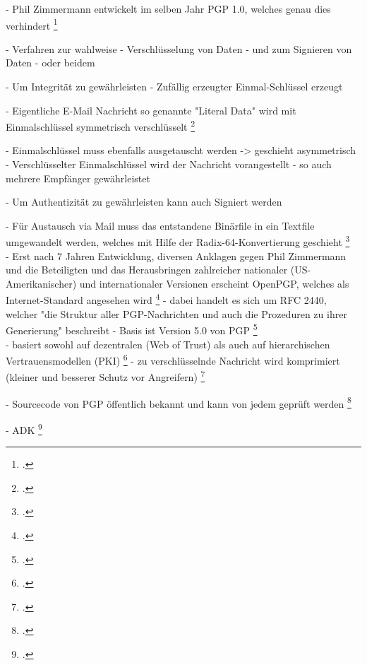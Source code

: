 \documentclass  [paper=a4,
				fontsize=12pt,
				listof=totoc,
				bibliography=totoc
				]{scrreprt}
\begin{document}
				- Phil Zimmermann entwickelt im selben Jahr PGP 1.0, welches genau dies verhindert 
				\footcite[][S. 29]{Schwenk}
				
				- Verfahren zur wahlweise
				- Verschlüsselung von Daten
				- und zum Signieren von Daten
				- oder beidem
				
				
				- Um Integrität zu gewährleisten
				- Zufällig erzeugter Einmal-Schlüssel erzeugt
				
				- Eigentliche E-Mail Nachricht so genannte "Literal Data" wird mit Einmalschlüssel symmetrisch verschlüsselt
				\footcite[][S. 43]{Schwenk}
				
				- Einmalschlüssel muss ebenfalls ausgetauscht werden -> geschieht asymmetrisch
				- Verschlüsselter Einmalschlüssel wird der Nachricht vorangestellt
				- so auch mehrere Empfänger gewährleistet
				
				
				- Um Authentizität zu gewährleisten kann auch Signiert werden
				
				- Für Austausch via Mail muss das entstandene Binärfile in ein Textfile umgewandelt werden, welches mit Hilfe der Radix-64-Konvertierung geschieht
				\footcite[][S. 47]{Schwenk}			
				\medskip\\
				
						
				- Erst nach 7 Jahren Entwicklung, diversen Anklagen gegen Phil Zimmermann und die Beteiligten und das Herausbringen zahlreicher nationaler (US-Amerikanischer) und internationaler Versionen erscheint OpenPGP, welches als Internet-Standard angesehen wird
				\footcite[][S. 29-35]{Schwenk}
				- dabei handelt es sich um RFC 2440, welcher "die Struktur aller PGP-Nachrichten und auch die Prozeduren zu ihrer Generierung" beschreibt
				- Basis ist Version 5.0 von PGP
				\footcite[][S. 42]{Schwenk}
				\medskip\\
				
										
				- basiert sowohl auf dezentralen (Web of Trust) als auch auf hierarchischen Vertrauensmodellen (PKI)
				\footcite[][S. 38f.]{Schwenk} 
				- zu verschlüsselnde Nachricht wird komprimiert (kleiner und besserer Schutz vor Angreifern)
				\footcite[][S. 45]{Schwenk}	
				
				- Sourcecode von PGP öffentlich bekannt und kann von jedem geprüft werden
				\footcite[][S. 47]{Schwenk}			
				
				- ADK
				\footcite[][S. 32]{Schwenk}
				\medskip\\
				
\end{document}
